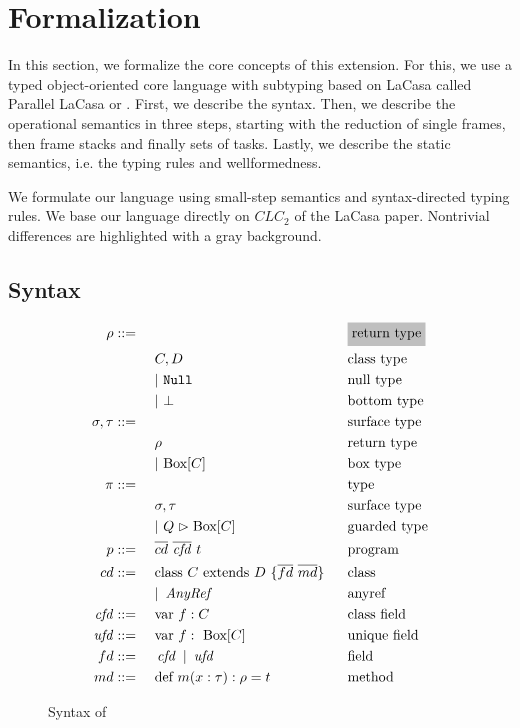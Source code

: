 \chapter{Formalization}\label{formal}
In this section, we formalize the core concepts of this extension. For this, we use a typed object-oriented core language with subtyping based on LaCasa called Parallel LaCasa or \plc. First, we describe the syntax. Then, we describe the operational semantics in three steps, starting with the reduction of single frames, then frame stacks and finally sets of tasks. Lastly, we describe the static semantics, i.e. the typing rules and wellformedness.

We formulate our language using small-step semantics and syntax-directed typing rules. We base our language directly on $CLC_2$ of the LaCasa paper. Nontrivial differences are highlighted with a gray background.

\section{Syntax}
\begin{figure}
    \centering
    \begin{alignat*}{4}
        \rho &::=\ && && \graybox{\text{return type}}\\
        & && C, D && \text{class type}\\
        & && |\ \mn{Null} && \text{null type}\\
        & && |\ \bot && \text{bottom type}\\
        \sigma, \tau &::=\ && && \text{surface type}\\
        & && \rho && \text{return type}\\
        & && |\ \text{Box}[C] && \text{box type}\\
        \pi &::=\ && && \text{type}\\
        & && \sigma, \tau && \text{surface type}\\
        & && |\ Q \vartriangleright \text{Box}[C] && \text{guarded type}\\
        p  &::=\ && \overline{cd}\ \overline{\vn{cfd}}\ t && \text{program} \\
        cd &::=\ && \text{class}\ C\ \text{extends}\ D\ \{ \overline{fd}\ \overline{md} \}\ \ && \text{class}\\
        & && |\ \vn{AnyRef} && \text{anyref}\\
        \vn{cfd} &::=\ && \text{var}\ f : C &&\text{class field}\\
        \vn{ufd} &::=\ && \text{var}\ f :\ \text{Box}[C] && \text{unique field}\\
        fd &::=\ && \vn{cfd} \ |\ \vn{ufd} && \text{field}\\
        md &::=\ && \text{def}\ m(x : \tau) : \rho = t && \text{method}\\
    \end{alignat*}
    
    \caption{Syntax of \plc}
    \label{fig:syntax}
\end{figure}

